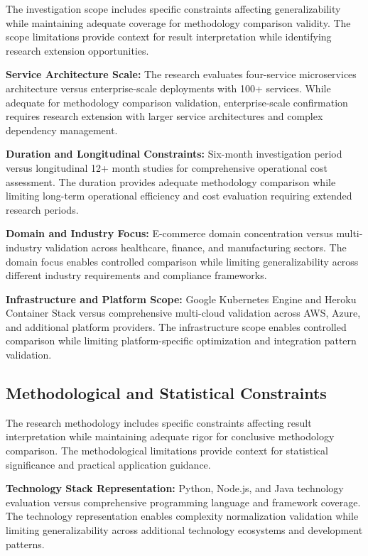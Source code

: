 The investigation scope includes specific constraints affecting generalizability while maintaining adequate coverage for methodology comparison validity. The scope limitations provide context for result interpretation while identifying research extension opportunities.

\textbf{Service Architecture Scale:}
The research evaluates four-service microservices architecture versus enterprise-scale deployments with 100+ services. While adequate for methodology comparison validation, enterprise-scale confirmation requires research extension with larger service architectures and complex dependency management.

\textbf{Duration and Longitudinal Constraints:}
Six-month investigation period versus longitudinal 12+ month studies for comprehensive operational cost assessment. The duration provides adequate methodology comparison while limiting long-term operational efficiency and cost evaluation requiring extended research periods.

\textbf{Domain and Industry Focus:}
E-commerce domain concentration versus multi-industry validation across healthcare, finance, and manufacturing sectors. The domain focus enables controlled comparison while limiting generalizability across different industry requirements and compliance frameworks.

\textbf{Infrastructure and Platform Scope:}
Google Kubernetes Engine and Heroku Container Stack versus comprehensive multi-cloud validation across AWS, Azure, and additional platform providers. The infrastructure scope enables controlled comparison while limiting platform-specific optimization and integration pattern validation.

\subsection{Methodological and Statistical Constraints}
\label{subsec:methodological_constraints}

The research methodology includes specific constraints affecting result interpretation while maintaining adequate rigor for conclusive methodology comparison. The methodological limitations provide context for statistical significance and practical application guidance.

\textbf{Technology Stack Representation:}
Python, Node.js, and Java technology evaluation versus comprehensive programming language and framework coverage. The technology representation enables complexity normalization validation while limiting generalizability across additional technology ecosystems and development patterns.

